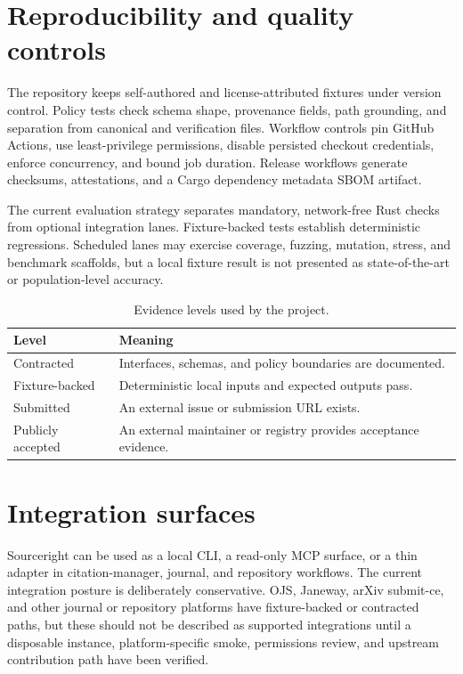 \documentclass[11pt]{article}
\begin{document}
\section{Reproducibility and quality controls}

The repository keeps self-authored and license-attributed fixtures under
version control. Policy tests check schema shape, provenance fields, path
grounding, and separation from canonical and verification files. Workflow
controls pin GitHub Actions, use least-privilege permissions, disable
persisted checkout credentials, enforce concurrency, and bound job duration.
Release workflows generate checksums, attestations, and a Cargo dependency
metadata SBOM artifact.

The current evaluation strategy separates mandatory, network-free Rust checks
from optional integration lanes. Fixture-backed tests establish deterministic
regressions. Scheduled lanes may exercise coverage, fuzzing, mutation,
stress, and benchmark scaffolds, but a local fixture result is not presented
as state-of-the-art or population-level accuracy.

\begin{table}[ht]
\centering
\caption{Evidence levels used by the project.}
\begin{tabular}{ll}
\toprule
Level & Meaning \\
\midrule
Contracted & Interfaces, schemas, and policy boundaries are documented. \\
Fixture-backed & Deterministic local inputs and expected outputs pass. \\
Submitted & An external issue or submission URL exists. \\
Publicly accepted & An external maintainer or registry provides acceptance evidence. \\
\bottomrule
\end{tabular}
\end{table}

\section{Integration surfaces}

Sourceright can be used as a local CLI, a read-only MCP surface, or a thin
adapter in citation-manager, journal, and repository workflows. The current
integration posture is deliberately conservative. OJS, Janeway, arXiv
submit-ce, and other journal or repository platforms have fixture-backed or
contracted paths, but these should not be described as supported integrations
until a disposable instance, platform-specific smoke, permissions review, and
upstream contribution path have been verified.
\end{document}
